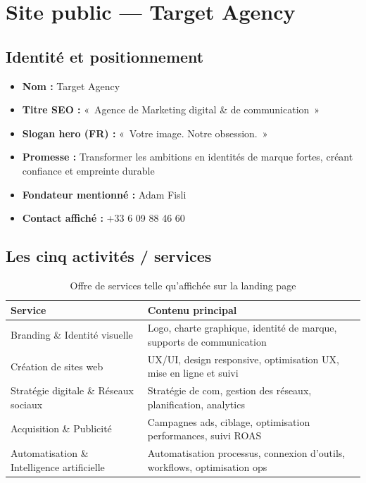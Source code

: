 \documentclass[11pt,a4paper]{report}
\begin{document}
\chapter{Site public — Target Agency}

\section{Identité et positionnement}

\begin{itemize}[leftmargin=*]
  \item \textbf{Nom :} Target Agency
  \item \textbf{Titre SEO :} «~Agence de Marketing digital \& de communication~»
  \item \textbf{Slogan hero (FR) :} «~Votre image. Notre obsession.~»
  \item \textbf{Promesse :} Transformer les ambitions en identités de marque fortes, créant confiance et empreinte durable
  \item \textbf{Fondateur mentionné :} Adam Fisli
  \item \textbf{Contact affiché :} +33 6 09 88 46 60
\end{itemize}

\section{Les cinq activités / services}

\begin{table}[h]
\centering
\small
\begin{tabular}{@{}p{4.5cm}p{9cm}@{}}
\toprule
\textbf{Service} & \textbf{Contenu principal} \\
\midrule
Branding \& Identité visuelle &
Logo, charte graphique, identité de marque, supports de communication \\

Création de sites web &
UX/UI, design responsive, optimisation UX, mise en ligne et suivi \\

Stratégie digitale \& Réseaux sociaux &
Stratégie de com, gestion des réseaux, planification, analytics \\

Acquisition \& Publicité &
Campagnes ads, ciblage, optimisation performances, suivi ROAS \\

Automatisation \& Intelligence artificielle &
Automatisation processus, connexion d'outils, workflows, optimisation ops \\
\bottomrule
\end{tabular}
\caption{Offre de services telle qu'affichée sur la landing page}
\end{table}
\end{document}

